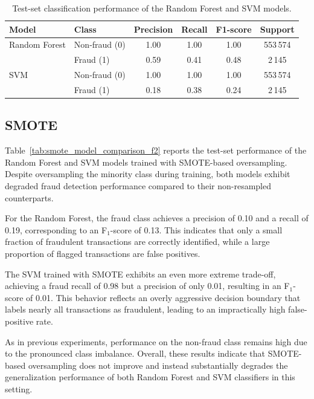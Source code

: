 \documentclass[oneside,12pt,parskip=half,american,numbers=noenddot]{scrreprt}
\begin{document}
\begin{table}[H]
\centering
\caption{Test-set classification performance of the Random Forest and SVM models.}
\label{tab:model_comparison_f2}
\small
\renewcommand{\arraystretch}{1.2}
\begin{tabular}{llcccc}
\hline
\textbf{Model} & \textbf{Class} & \textbf{Precision} & \textbf{Recall} & \textbf{F1-score} & \textbf{Support} \\
\hline
Random Forest & Non-fraud (0) & 1.00 & 1.00 & 1.00 & 553\,574 \\
              & Fraud (1)     & 0.59 & 0.41 & 0.48 & 2\,145 \\
\hline
SVM           & Non-fraud (0) & 1.00 & 1.00 & 1.00 & 553\,574 \\
              & Fraud (1)     & 0.18 & 0.38 & 0.24 & 2\,145 \\
\hline
\end{tabular}
\end{table}




\subsection{SMOTE}
\label{subsec:smote}

Table~\ref{tab:smote_model_comparison_f2} reports the test-set performance of the Random Forest and SVM models trained with SMOTE-based oversampling. Despite oversampling the minority class during training, both models exhibit degraded fraud detection performance compared to their non-resampled counterparts.

For the Random Forest, the fraud class achieves a precision of 0.10 and a recall of 0.19, corresponding to an F$_1$-score of 0.13. This indicates that only a small fraction of fraudulent transactions are correctly identified, while a large proportion of flagged transactions are false positives.  

The SVM trained with SMOTE exhibits an even more extreme trade-off, achieving a fraud recall of 0.98 but a precision of only 0.01, resulting in an F$_1$-score of 0.01. This behavior reflects an overly aggressive decision boundary that labels nearly all transactions as fraudulent, leading to an impractically high false-positive rate.

As in previous experiments, performance on the non-fraud class remains high due to the pronounced class imbalance. Overall, these results indicate that SMOTE-based oversampling does not improve and instead substantially degrades the generalization performance of both Random Forest and SVM classifiers in this setting.
\end{document}

